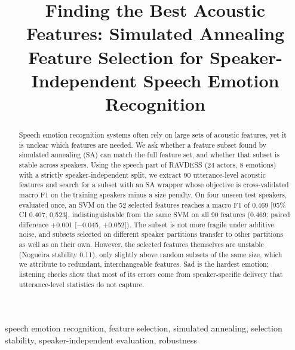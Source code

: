 \documentclass[conference]{IEEEtran}
\newcommand{\TODO}[1]{\textcolor{red}{[TODO: #1]}}
\begin{document}
\title{Finding the Best Acoustic Features: Simulated Annealing\\
Feature Selection for Speaker-Independent Speech Emotion Recognition}

\author{
\IEEEauthorblockN{\TODO{Member A name}}
\IEEEauthorblockA{\TODO{Affiliation}}
\and
\IEEEauthorblockN{\TODO{Member B name}}
\IEEEauthorblockA{\TODO{Affiliation}}
\and
\IEEEauthorblockN{\TODO{Member C name}}
\IEEEauthorblockA{\TODO{Affiliation}}
}

\maketitle

\begin{abstract}
Speech emotion recognition systems often rely on large sets of acoustic features, yet it is
unclear which features are needed. We ask whether a feature subset found by simulated
annealing (SA) can match the full feature set, and whether that subset is stable across
speakers. Using the speech part of RAVDESS (24 actors, 8 emotions) with a strictly
speaker-independent split, we extract 90 utterance-level acoustic features and search for a
subset with an SA wrapper whose objective is cross-validated macro F1 on the training speakers
minus a size penalty. On four unseen test speakers, evaluated once, an SVM on the 52 selected
features reaches a macro F1 of 0.469 [95\% CI 0.407, 0.523], indistinguishable from the same
SVM on all 90 features (0.469; paired difference +0.001 [$-$0.045, +0.052]). The subset is not
more fragile under additive noise, and subsets selected on different speaker partitions
transfer to other partitions as well as on their own. However, the selected features themselves
are unstable (Nogueira stability 0.11), only slightly above random subsets of the same size,
which we attribute to redundant, interchangeable features. Sad is the hardest emotion; listening
checks show that most of its errors come from speaker-specific delivery that utterance-level
statistics do not capture.
\end{abstract}

\begin{IEEEkeywords}
speech emotion recognition, feature selection, simulated annealing, selection stability,
speaker-independent evaluation, robustness
\end{IEEEkeywords}

\end{document}
